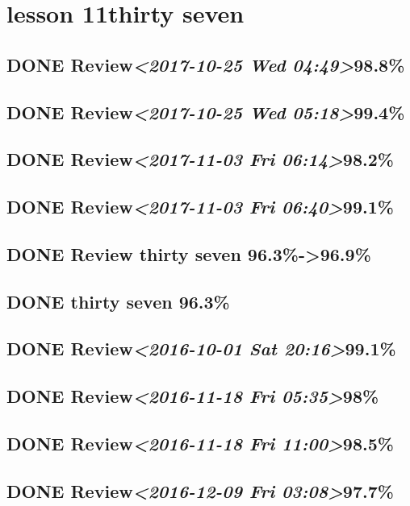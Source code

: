 \documentclass[11pt]{ctexart}
\begin{document}
\section{lesson 11thirty seven}
\label{sec:org6e3afc1}
\subsection{{\bfseries\sffamily DONE} Review\textit{<2017-10-25 Wed 04:49>}98.8\%}
\label{sec:org303bcdb}
\subsection{{\bfseries\sffamily DONE} Review\textit{<2017-10-25 Wed 05:18>}99.4\%}
\label{sec:org8abab05}
\subsection{{\bfseries\sffamily DONE} Review\textit{<2017-11-03 Fri 06:14>}98.2\%}
\label{sec:org6e2a389}
\subsection{{\bfseries\sffamily DONE} Review\textit{<2017-11-03 Fri 06:40>}99.1\%}
\label{sec:org5ed9cb7}
\subsection{{\bfseries\sffamily DONE} Review thirty seven 96.3\%->96.9\%}
\label{sec:orgb259dc6}
\subsection{{\bfseries\sffamily DONE} thirty seven 96.3\%}
\label{sec:orgb8ec696}
\subsection{{\bfseries\sffamily DONE} Review\textit{<2016-10-01 Sat 20:16>}99.1\%}
\label{sec:org6ee0389}
\subsection{{\bfseries\sffamily DONE} Review\textit{<2016-11-18 Fri 05:35>}98\%}
\label{sec:org8e70182}
\subsection{{\bfseries\sffamily DONE} Review\textit{<2016-11-18 Fri 11:00>}98.5\%}
\label{sec:org72a1323}
\subsection{{\bfseries\sffamily DONE} Review\textit{<2016-12-09 Fri 03:08>}97.7\%}
\label{sec:orga04da2d}
\end{document}
